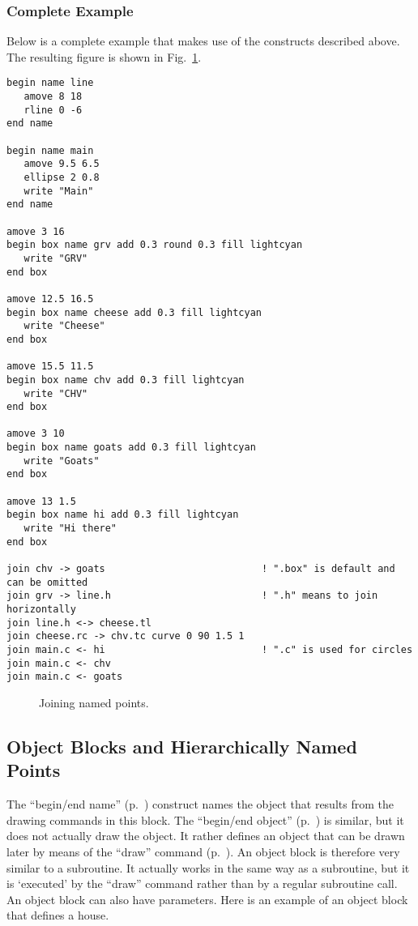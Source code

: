 \subsubsection{Complete Example}

Below is a complete example that makes use of the constructs described above. The resulting figure is shown in Fig.~\ref{fig:joindiag}.

\begin{verbatim}
begin name line
   amove 8 18
   rline 0 -6
end name

begin name main
   amove 9.5 6.5
   ellipse 2 0.8
   write "Main"
end name

amove 3 16
begin box name grv add 0.3 round 0.3 fill lightcyan
   write "GRV"
end box

amove 12.5 16.5
begin box name cheese add 0.3 fill lightcyan
   write "Cheese"
end box

amove 15.5 11.5
begin box name chv add 0.3 fill lightcyan
   write "CHV"
end box

amove 3 10
begin box name goats add 0.3 fill lightcyan
   write "Goats"
end box

amove 13 1.5
begin box name hi add 0.3 fill lightcyan
   write "Hi there"
end box

join chv -> goats                           ! ".box" is default and can be omitted
join grv -> line.h                          ! ".h" means to join horizontally
join line.h <-> cheese.tl
join cheese.rc -> chv.tc curve 0 90 1.5 1
join main.c <- hi                           ! ".c" is used for circles
join main.c <- chv
join main.c <- goats
\end{verbatim}

\begin{figure}[tb]
\centering
{}
\caption{\label{fig:joindiag}Joining named points.}
\end{figure}

\subsection{Object Blocks and Hierarchically Named Points}
\label{sec:objblocks}

The ``begin/end name'' (p.~\pageref{cmd:beginname}) construct names the object that results from the drawing commands in this block. The ``begin/end object'' (p.~\pageref{cmd:beginobject}) is similar, but it does not actually draw the object. It rather defines an object that can be drawn later by means of the ``draw'' command (p.~\pageref{cmd:draw}). An object block is therefore very similar to a subroutine. It actually works in the same way as a subroutine, but it is `executed' by the ``draw'' command rather than by a regular subroutine call. An object block can also have parameters. Here is an example of an object block that defines a house.

